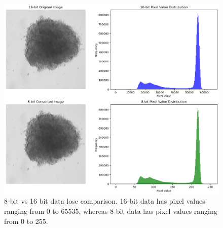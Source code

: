  \begin{figure}[H]
  \centering
  \includegraphics[scale=0.5]{figures/8bitvs16bit.png} 
  \caption{8-bit vs 16 bit data lose comparison. 16-bit data has pixel values ranging from 0 to 65535, whereas 8-bit data has pixel values ranging from 0 to 255.}
  \label{fig:8bitvs16bit}
\end{figure}

